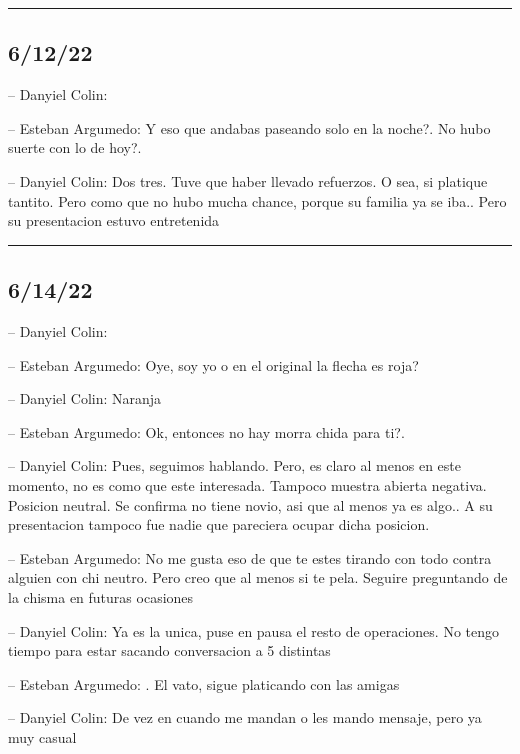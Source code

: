 \begin{center}\rule{0.5\linewidth}{0.5pt}\end{center}

\hypertarget{section-100}{%
\subsection{6/12/22}\label{section-100}}

-- Danyiel Colin:

-- Esteban Argumedo: Y eso que andabas paseando solo en la noche?. No
hubo suerte con lo de hoy?.

-- Danyiel Colin: Dos tres. Tuve que haber llevado refuerzos. O sea, si
platique tantito. Pero como que no hubo mucha chance, porque su familia
ya se iba.. Pero su presentacion estuvo entretenida

\begin{center}\rule{0.5\linewidth}{0.5pt}\end{center}

\hypertarget{section-101}{%
\subsection{6/14/22}\label{section-101}}

-- Danyiel Colin:

-- Esteban Argumedo: Oye, soy yo o en el original la flecha es roja?

-- Danyiel Colin: Naranja

-- Esteban Argumedo: Ok, entonces no hay morra chida para ti?.

-- Danyiel Colin: Pues, seguimos hablando. Pero, es claro al menos en
este momento, no es como que este interesada. Tampoco muestra abierta
negativa. Posicion neutral. Se confirma no tiene novio, asi que al menos
ya es algo.. A su presentacion tampoco fue nadie que pareciera ocupar
dicha posicion.

-- Esteban Argumedo: No me gusta eso de que te estes tirando con todo
contra alguien con chi neutro. Pero creo que al menos si te pela.
Seguire preguntando de la chisma en futuras ocasiones

-- Danyiel Colin: Ya es la unica, puse en pausa el resto de operaciones.
No tengo tiempo para estar sacando conversacion a 5 distintas

-- Esteban Argumedo: . El vato, sigue platicando con las amigas

-- Danyiel Colin: De vez en cuando me mandan o les mando mensaje, pero
ya muy casual

